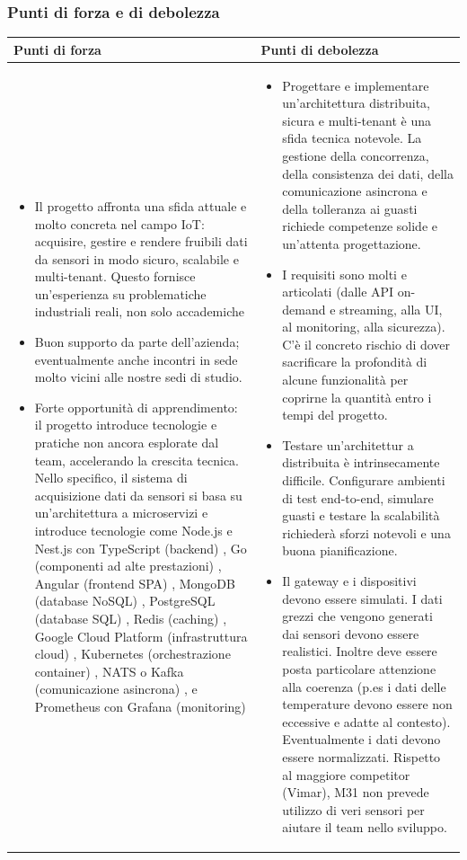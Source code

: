 \documentclass[a4paper,11pt]{article}
\begin{document}
\subsubsection{Punti di forza e di debolezza}
{\footnotesize
\begin{tabularx}{\textwidth}{|X|X|}
\hline
\rowcolor{lightgray!40} %
\textbf{Punti di forza} & \textbf{Punti di debolezza} \\
\hline
\begin{itemize}
\item  Il progetto affronta una sfida attuale e molto concreta nel campo IoT: acquisire, gestire e rendere fruibili dati da sensori in modo sicuro, scalabile e multi-tenant. Questo fornisce un'esperienza su problematiche industriali reali, non solo accademiche
\item Buon supporto da parte dell'azienda; eventualmente anche incontri in sede molto vicini alle nostre sedi di studio.
\item Forte opportunità di apprendimento: il progetto introduce tecnologie e pratiche non ancora esplorate dal team, accelerando la crescita tecnica. Nello specifico, il sistema di acquisizione dati da sensori si basa su un'architettura a microservizi e introduce tecnologie come Node.js e Nest.js con TypeScript (backend) , Go (componenti ad alte prestazioni) , Angular (frontend SPA) , MongoDB (database NoSQL) , PostgreSQL (database SQL) , Redis (caching) , Google Cloud Platform (infrastruttura cloud) , Kubernetes (orchestrazione container) , NATS o Kafka (comunicazione asincrona) , e Prometheus con Grafana (monitoring)
\end{itemize}
 & \begin{itemize}
\item Progettare e implementare un'architettura distribuita, sicura e multi-tenant è una sfida tecnica notevole. La gestione della concorrenza, della consistenza dei dati, della comunicazione asincrona e della tolleranza ai guasti richiede competenze solide e un'attenta progettazione.
\item 	I requisiti sono molti e articolati (dalle API on-demand e streaming, alla UI, al monitoring, alla sicurezza). C'è il concreto rischio di dover sacrificare la profondità di alcune funzionalità per coprirne la quantità entro i tempi del progetto.
\item Testare un'architettur a distribuita è intrinsecamente difficile. Configurare ambienti di test end-to-end, simulare guasti e testare la scalabilità richiederà sforzi notevoli e una buona pianificazione.
\item  Il gateway e i dispositivi devono essere simulati. I dati grezzi che vengono generati dai sensori devono essere realistici. Inoltre deve essere posta particolare attenzione alla coerenza (p.es i dati delle temperature devono essere non eccessive e adatte al contesto). Eventualmente i dati devono essere normalizzati. Rispetto al maggiore competitor (Vimar), M31 non prevede utilizzo di veri sensori per aiutare il team nello sviluppo.
\end{itemize} \\
\hline
\end{tabularx}
}
\end{document}
